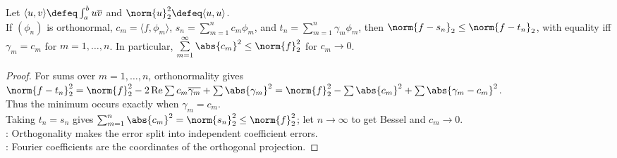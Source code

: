 \begin{theorem} \label{thm:orthonormal-fourier-best-approximation-bessel} \\
Let $\langle u,v\rangle\defeq\int_a^b u\overline v$ and $\norm{u}_2^2\defeq\langle u,u\rangle$.\\
If $(\phi_n)$ is orthonormal, $c_m=\langle f,\phi_m\rangle$, $s_n=\sum\limits_{m=1}^{n}c_m\phi_m$, and $t_n=\sum\limits_{m=1}^{n}\gamma_m\phi_m$, then $\norm{f-s_n}_2\leq\norm{f-t_n}_2$, with equality iff $\gamma_m=c_m$ for $m=1,\ldots,n$. In particular, $\sum\limits_{m=1}^{\infty}\abs{c_m}^2\leq\norm{f}_2^2$ for $c_m\to0$.
\begin{proof}
For sums over $m=1,\ldots,n$, orthonormality gives\\
$\norm{f-t_n}_2^2 =\norm{f}_2^2-2\operatorname{Re}\sum c_m\overline{\gamma_m}+\sum\abs{\gamma_m}^2 =\norm{f}_2^2-\sum\abs{c_m}^2+\sum\abs{\gamma_m-c_m}^2$.\\
Thus the minimum occurs exactly when $\gamma_m=c_m$.\\
Taking $t_n=s_n$ gives $\sum_{m=1}^{n}\abs{c_m}^2=\norm{s_n}_2^2\leq\norm{f}_2^2$; let $n\to\infty$ to get Bessel and $c_m\to0$.\\
: Orthogonality makes the error split into independent coefficient errors.\\
: Fourier coefficients are the coordinates of the orthogonal projection.
\end{proof}
\end{theorem}

